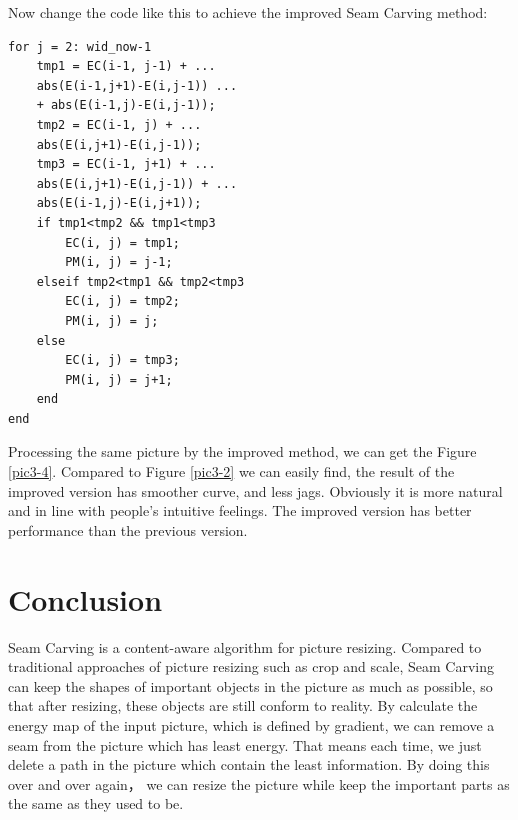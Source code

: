 \documentclass[final]{cvpr}
\begin{document}
Now change the code like this to achieve the improved Seam Carving method:
\begin{lstlisting}
for j = 2: wid_now-1
    tmp1 = EC(i-1, j-1) + ...
    abs(E(i-1,j+1)-E(i,j-1)) ...
    + abs(E(i-1,j)-E(i,j-1));
    tmp2 = EC(i-1, j) + ...
    abs(E(i,j+1)-E(i,j-1));
    tmp3 = EC(i-1, j+1) + ...
    abs(E(i,j+1)-E(i,j-1)) + ...
    abs(E(i-1,j)-E(i,j+1));
    if tmp1<tmp2 && tmp1<tmp3
        EC(i, j) = tmp1;
        PM(i, j) = j-1;
    elseif tmp2<tmp1 && tmp2<tmp3
        EC(i, j) = tmp2;
        PM(i, j) = j;
    else
        EC(i, j) = tmp3;
        PM(i, j) = j+1;
    end
end
\end{lstlisting}

Processing the same picture by the improved method, we can get the Figure \ref{pic3-4}. Compared to Figure \ref{pic3-2} we can easily find, the result of the improved version has smoother curve, and less jags. Obviously it is more natural and in line with people's intuitive feelings. The improved version has better performance than the previous version.


\section{Conclusion}
Seam Carving is a content-aware algorithm for picture resizing. Compared to traditional approaches of picture resizing such as crop and scale, Seam Carving can keep the shapes of important objects in the picture as much as possible, so that after resizing, these objects are still conform to reality. By calculate the energy map of the input picture, which is defined by gradient, we can remove a seam from the picture which has least energy. That means each time, we just delete a path in the picture which contain the least information. By doing this over and over again， we can resize the picture while keep the important parts as the same as they used to be.
\end{document}
